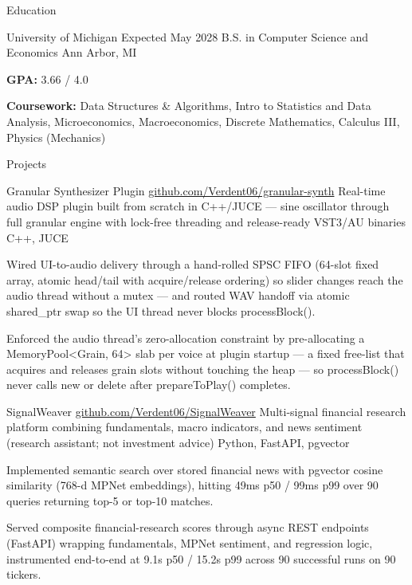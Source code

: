 \documentclass[
	11pt
]{../../../template}
\begin{document}
	\begin{rSection}{E}{ducation}
		\begin{rSectionEntry}
			{University of Michigan}
			{Expected May 2028}
			{B.S. in Computer Science and Economics}
			{}
			{Ann Arbor, MI}

			\item \textbf{GPA:} 3.66 / 4.0
			\item \textbf{Coursework:} Data Structures \& Algorithms, Intro to Statistics and Data Analysis, Microeconomics, Macroeconomics, Discrete Mathematics, Calculus III, Physics (Mechanics)
		\end{rSectionEntry}
	\end{rSection}

	\begin{rSection}{P}{rojects}
		\begin{rSectionEntry}
			{Granular Synthesizer Plugin}
			{\href{https://github.com/Verdent06/granular-synth}{github.com/Verdent06/granular-synth}}
			{Real-time audio DSP plugin built from scratch in C++/JUCE --- sine oscillator through full granular engine with lock-free threading and release-ready VST3/AU binaries}
			{C++, JUCE}
			{}

			\item Wired UI-to-audio delivery through a hand-rolled SPSC FIFO (64-slot fixed array, atomic head/tail with acquire/release ordering) so slider changes reach the audio thread without a mutex --- and routed WAV handoff via atomic shared\_ptr swap so the UI thread never blocks processBlock().
			\item Enforced the audio thread's zero-allocation constraint by pre-allocating a MemoryPool\textless{}Grain, 64\textgreater{} slab per voice at plugin startup --- a fixed free-list that acquires and releases grain slots without touching the heap --- so processBlock() never calls new or delete after prepareToPlay() completes.
		\end{rSectionEntry}

		\begin{rSectionEntry}
			{SignalWeaver}
			{\href{https://github.com/Verdent06/SignalWeaver}{github.com/Verdent06/SignalWeaver}}
			{Multi-signal financial research platform combining fundamentals, macro indicators, and news sentiment (research assistant; not investment advice)}
			{Python, FastAPI, pgvector}
			{}

			\item Implemented semantic search over stored financial news with pgvector cosine similarity (768-d MPNet embeddings), hitting 49ms p50 / 99ms p99 over 90 queries returning top-5 or top-10 matches.
			\item Served composite financial-research scores through async REST endpoints (FastAPI) wrapping fundamentals, MPNet sentiment, and regression logic, instrumented end-to-end at 9.1s p50 / 15.2s p99 across 90 successful runs on 90 tickers.
		\end{rSectionEntry}
	\end{rSection}
\end{document}
